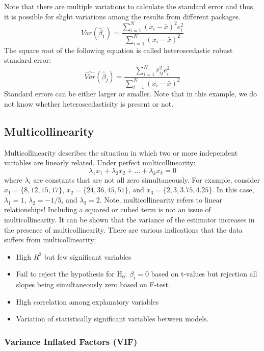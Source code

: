 \documentclass[
]{article}
\providecommand{\tightlist}{%
  \setlength{\itemsep}{0pt}\setlength{\parskip}{0pt}}
\begin{document}
Note that there are multiple variations to calculate the standard error and thus, it is possible for slight variations among the results from different packages.
\[Var(\hat{\beta}_1) = \frac{\sum_{i=1}^N (x_i-\bar{x})^2 e_i^2}{\sum_{i=1}^N (x_i-\bar{x})^2}\]
The square root of the following equation is called heteroscedastic robust standard error:
\[\widehat{Var}(\hat{\beta}_j) = \frac{\sum_{i=1}^N \hat{r}^2_{ij} e_i^2}{\sum_{i=1}^N (x_i-\bar{x})^2}\]
Standard errors can be either larger or smaller. Note that in this example, we do not know whether heteroscedasticity is present or not.

\hypertarget{multicollinearity}{%
\subsection{Multicollinearity}\label{multicollinearity}}

Multicollinearity describes the situation in which two or more independent variables are linearly related. Under perfect multicollinearity:
\[\lambda_1 x_1 + \lambda_2 x_2 + \dots +\lambda_k x_k = 0\]
where \(\lambda_i\) are constants that are not all zero simultaneously. For example, consider \(x_1=\{8,12,15,17\}\), \(x_2=\{24,36,45,51\}\), and \(x_3=\{2,3,3.75,4.25\}\). In this case, \(\lambda_1=1\), \(\lambda_2=-1/5\), and \(\lambda_3=2\). Note, multicollinearity refers to linear relationships! Including a squared or cubed term is not an issue of multicollinearity. It can be shown that the variance of the estimator increases in the presence of multicollinearity. There are various indications that the data suffers from multicollinearity:

\begin{itemize}
\tightlist
\item
  High \(R^2\) but few significant variables
\item
  Fail to reject the hypothesis for H\(_0\): \(\beta_i=0\) based on t-values but rejection all slopes being simultaneously zero based on F-test.
\item
  High correlation among explanatory variables
\item
  Variation of statistically significant variables between models.
\end{itemize}

\hypertarget{variance-inflated-factors-vif}{%
\subsubsection{Variance Inflated Factors (VIF)}\label{variance-inflated-factors-vif}}
\end{document}
